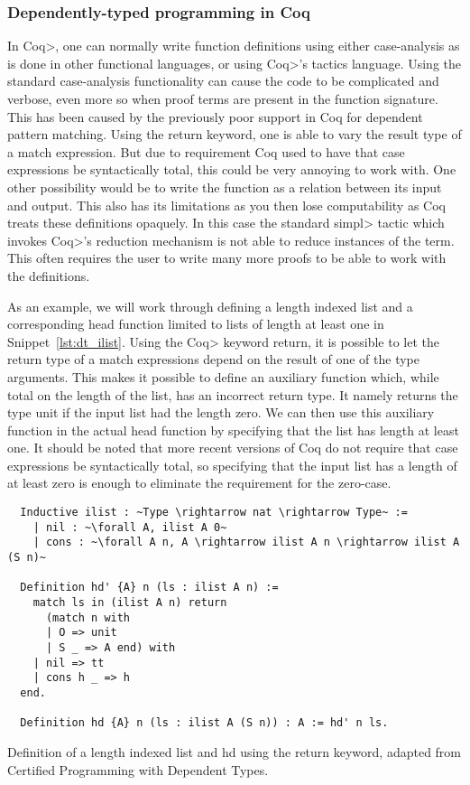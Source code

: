 \subsubsection{Dependently-typed programming in Coq}

In \<Coq>, one can normally write function definitions using either case-analysis as is done in other functional languages, or using \<Coq>'s tactics language.
Using the standard case-analysis functionality can cause the code to be complicated and verbose, even more so when proof terms are present in the function signature.
This has been caused by the previously poor support in Coq for dependent pattern matching.
Using the return keyword, one is able to vary the result type of a match expression. But due to requirement Coq used to have that case expressions be syntactically total, this could be very annoying to work with.
One other possibility would be to write the function as a relation between its input and output.
This also has its limitations as you then lose computability as Coq treats these definitions opaquely. In this case the standard \<simpl> tactic which invokes \<Coq>'s reduction mechanism is not able to reduce instances of the term.
This often requires the user to write many more proofs to be able to work with the definitions.

As an example, we will work through defining a length indexed list and a corresponding head function limited to lists of length at least one in Snippet~\ref{lst:dt_ilist}.
Using the \<Coq> keyword return, it is possible to let the return type of a match expressions depend on the result of one of the type arguments.
This makes it possible to define an auxiliary function which, while total on the length of the list, has an incorrect return type. It namely returns the type unit if the input list had the length zero.
We can then use this auxiliary function in the actual head function by specifying that the list has length at least one.
It should be noted that more recent versions of Coq do not require that case expressions be syntactically total, so specifying that the input list has a length of at least zero is enough to eliminate the requirement for the zero-case.

\begin{listing}
  \begin{verbatim}
  Inductive ilist : ~Type \rightarrow nat \rightarrow Type~ :=
    | nil : ~\forall A, ilist A 0~
    | cons : ~\forall A n, A \rightarrow ilist A n \rightarrow ilist A (S n)~

  Definition hd' {A} n (ls : ilist A n) :=
    match ls in (ilist A n) return
      (match n with
      | O => unit
      | S _ => A end) with
    | nil => tt
    | cons h _ => h
  end.

  Definition hd {A} n (ls : ilist A (S n)) : A := hd' n ls.
  \end{verbatim}
  \caption{Definition of a length indexed list and hd using the return keyword, adapted from Certified Programming with Dependent Types\cite{ChlipalaCPDT}.}
  \label{lst:dt_ilist}
\end{listing}

